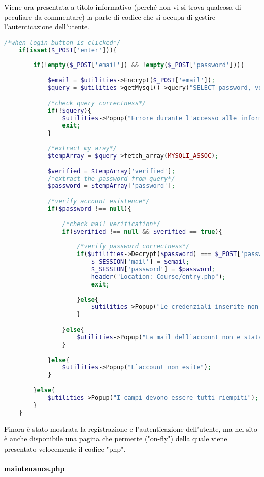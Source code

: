  \textcolor{black}{Viene ora presentata a titolo informativo (perché non vi si trova qualcosa di peculiare da commentare) la parte di codice che si occupa di gestire l'autenticazione dell'utente.}\\ 

\begin{lstlisting}[language=php]
	/*when login button is clicked*/
	if(isset($_POST['enter'])){
		
		if(!empty($_POST['email']) && !empty($_POST['password'])){
			
			$email = $utilities->Encrypt($_POST['email']);
			$query = $utilities->getMysql()->query("SELECT password, verified FROM user_table1 WHERE (email = '{$email}')");
			
			/*check query correctness*/
			if(!$query){
				$utilities->Popup("Errore durante l'accesso alle informazioni");
				exit;
			}
			
			/*extract my aray*/
			$tempArray = $query->fetch_array(MYSQLI_ASSOC);
			
			$verified = $tempArray['verified'];
			/*extract the password from query*/
			$password = $tempArray['password'];
			
			/*verify account esistence*/  
			if($password !== null){
				
				/*check mail verification*/
				if($verified !== null && $verified == true){
					
					/*verify password correctness*/
					if($utilities->Decrypt($password) === $_POST['password']){
						$_SESSION['mail'] = $email;
						$_SESSION['password'] = $password;
						header("Location: Course/entry.php");
						exit;
						
					}else{
						$utilities->Popup("Le credenziali inserite non sono corrette");
					}
					
				}else{
					$utilities->Popup("La mail dell`account non e stata verificata.");
				}
				
			}else{
				$utilities->Popup("L`account non esite");
			}
			
		}else{
			$utilities->Popup("I campi devono essere tutti riempiti");
		}
	}
\end{lstlisting}

\textcolor{black}{Finora è stato mostrata la registrazione e l'autenticazione dell'utente, ma nel sito è anche disponibile una pagina che permette ("on-fly") della quale viene presentato velocemente il codice "php".}\\

\paragraph{\textcolor{black}{maintenance.php}}\leavevmode\\

